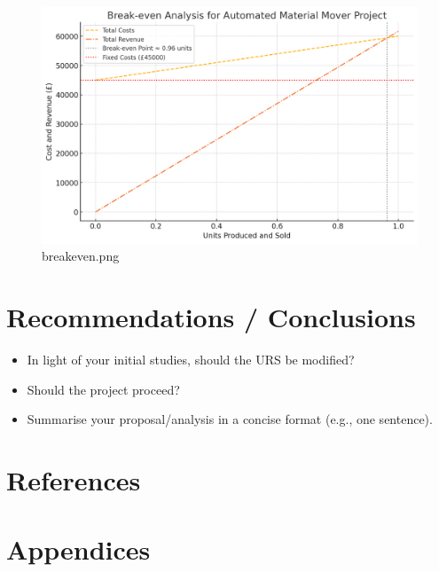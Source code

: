 \documentclass[12pt]{article}
\begin{document}
\begin{figure}[h!]
    \centering
     \includegraphics[width=1\textwidth]{breakeven.png}
        \caption{breakeven.png}
         \label{fig:timeline}
\end{figure}



\section{Recommendations / Conclusions}
    \begin{itemize}
        \item In light of your initial studies, should the URS be modified?
        \item Should the project proceed?
        \item Summarise your proposal/analysis in a concise format (e.g., one sentence).
    \end{itemize}
 
 
\section{References}



\section{Appendices}
 
 
\end{document}
